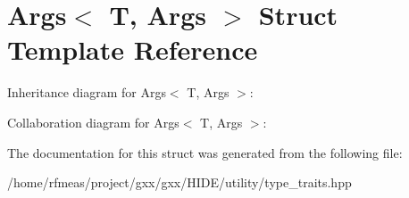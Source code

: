 \hypertarget{structArgs}{}\section{Args$<$ T, Args $>$ Struct Template Reference}
\label{structArgs}


Inheritance diagram for Args$<$ T, Args $>$\+:


Collaboration diagram for Args$<$ T, Args $>$\+:


The documentation for this struct was generated from the following file\+:\begin{DoxyCompactItemize}
\item 
/home/rfmeas/project/gxx/gxx/\+H\+I\+D\+E/utility/type\+\_\+traits.\+hpp\end{DoxyCompactItemize}
